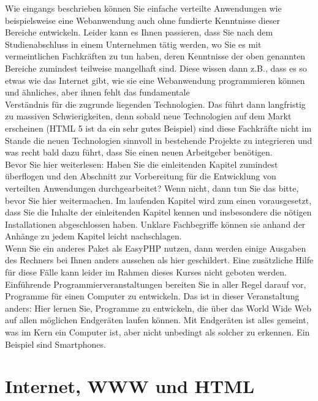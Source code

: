 Wie eingangs beschrieben können Sie einfache verteilte Anwendungen wie beispielsweise eine Webanwendung auch ohne fundierte Kenntnisse dieser Bereiche entwickeln. Leider kann es Ihnen passieren, dass Sie nach dem Studienabschluss in einem Unternehmen tätig werden, wo Sie es mit vermeintlichen Fachkräften zu tun haben, deren Kenntnisse der oben genannten Bereiche zumindest teilweise mangelhaft sind. Diese wissen dann z.B., dass es so etwas wie \glqq{}das Internet\grqq{} gibt, wie sie eine Webanwendung programmieren können und ähnliches, aber ihnen fehlt das fundamentale\\ Verständnis für die zugrunde liegenden Technologien. Das führt dann langfristig zu massiven Schwierigkeiten, denn sobald neue Technologien auf dem Markt erscheinen (HTML 5 ist da ein sehr gutes Beispiel) sind diese \glqq{}Fachkräfte\grqq{} nicht im Stande die neuen Technologien sinnvoll in bestehende Projekte zu integrieren und was recht bald dazu führt, dass Sie einen neuen Arbeitgeber benötigen.\\

Bevor Sie hier weiterlesen: Haben Sie die einleitenden Kapitel zumindest überflogen und den Abschnitt zur Vorbereitung für die Entwicklung von verteilten Anwendungen durchgearbeitet? Wenn nicht, dann tun Sie das bitte, bevor Sie hier weitermachen. Im laufenden Kapitel wird zum einen vorausgesetzt, dass Sie die Inhalte der einleitenden Kapitel kennen und insbesondere die nötigen Installationen abgeschlossen haben. Unklare Fachbegriffe können sie anhand der Anhänge zu jedem Kapitel leicht nachschlagen.\\

Wenn Sie ein anderes Paket als EasyPHP nutzen, dann werden einige Ausgaben des Rechners bei Ihnen anders aussehen als hier geschildert. Eine zusätzliche Hilfe für diese Fälle kann leider im Rahmen dieses Kurses nicht geboten werden.\\

Einführende Programmierveranstaltungen bereiten Sie in aller Regel darauf vor, Programme für einen Computer zu entwickeln. Das ist in dieser Veranstaltung anders: Hier lernen Sie, Programme zu entwickeln, die über das World Wide Web auf allen möglichen Endgeräten laufen können. Mit Endgeräten ist alles gemeint, was im Kern ein Computer ist, aber nicht unbedingt als solcher zu erkennen. Ein Beispiel sind Smartphones.\\

\section{Internet, WWW und HTML}


